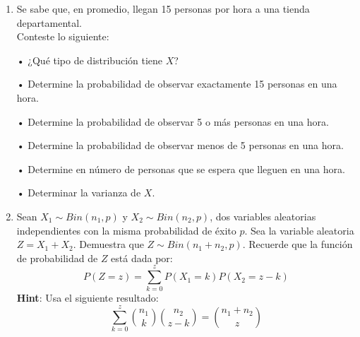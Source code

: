 \documentclass[a4paper, 12pt]{article}
\newcommand{\Aspace}{0.2cm}
\begin{document}
\begin{enumerate}
    \item Se sabe que, en promedio, llegan 15 personas por hora a una tienda departamental.
    \\ Conteste lo siguiente:
    \vspace{\Aspace} \par
    • ¿Qué tipo de distribución tiene $X$?
    \\ { \color{azul}  }

    \vspace{\Aspace} \par
    • Determine la probabilidad de observar exactamente 15 personas en una hora.
    \\ { \color{azul}  }

    \vspace{\Aspace} \par
    • Determine la probabilidad de observar 5 o más personas en una hora.
    \\ { \color{azul}  }

    \vspace{\Aspace} \par
    • Determine la probabilidad de observar menos de 5 personas en una hora.
    \\ { \color{azul}  }

    \vspace{\Aspace} \par
    • Determine en número de personas que se espera que lleguen en una hora.
    \\ { \color{azul}  }

    \vspace{\Aspace} \par
    • Determinar la varianza de $X$.
    \\ { \color{azul}  }



    \item Sean $X_{1} \sim Bin(n_{1}, p)$ y $X_{2} \sim Bin(n_{2}, p)$, dos variables aleatorias independientes con la misma probabilidad de éxito $p$.  
    Sea la variable aleatoria $Z = X_{1} + X_{2}$. Demuestra que $Z \sim Bin(n_{1} + n_{2}, p)$.  
    Recuerde que la función de probabilidad de $Z$ está dada por:
    \[
        P(Z = z) = \sum_{k = 0}^{z} P(X_{1} = k) P(X_{2} = z - k)
    \]
    \textbf{Hint}: Usa el siguiente resultado:
    \[
        \sum_{k = 0}^{z} \binom{n_{1}}{k} \binom{n_{2}}{z - k} = \binom{n_{1} + n_{2}}{z}
    \]
    \vspace{\Aspace} \par
    { \color{azul}  }



\end{enumerate}
\end{document}
